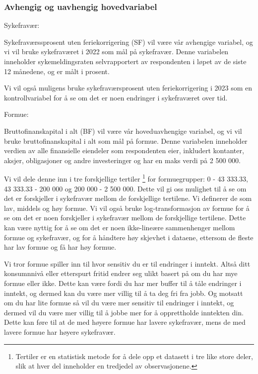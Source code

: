 \documentclass[
  12pt,
  a4paper,
  DIV=11,
  numbers=noendperiod]{scrartcl}
\begin{document}
\subsubsection{Avhengig og uavhengig
hovedvariabel}\label{avhengig-og-uavhengig-hovedvariabel}

Sykefravær:

Sykefraværssprosent uten feriekorrigering (SF) vil være vår avhengige
variabel, og vi vil bruke sykefraværet i 2022 som mål på sykefravær.
Denne variabelen inneholder sykemeldingsraten selvrapportert av
respondenten i løpet av de siste 12 månedene, og er målt i prosent.

Vi vil også muligens bruke sykefraværsprosent uten feriekorrigering i
2023 som en kontrollvariabel for å se om det er noen endringer i
sykefraværet over tid.

Formue:

Bruttofinanskapital i alt (BF) vil være vår hoveduavhengige variabel, og
vi vil bruke bruttofinanskapital i alt som mål på formue. Denne
variabelen inneholder verdien av alle finansielle eiendeler som
respondenten eier, inkludert kontanter, aksjer, obligasjoner og andre
investeringer og har en maks verdi på 2 500 000.

Vi vil dele denne inn i tre forskjellige tertiler \footnote{Tertiler er
  en statistisk metode for å dele opp et datasett i tre like store
  deler, slik at hver del inneholder en tredjedel av observasjonene.}
for formuegrupper: 0 - 43 333.33, 43 333.33 - 200 000 og 200 000 - 2 500
000. Dette vil gi oss mulighet til å se om det er forskjeller i
sykefravær mellom de forskjellige tertilene. Vi definerer de som lav,
middels og høy formue. Vi vil også bruke log-transformasjon av formue
for å se om det er noen forskjeller i sykefravær mellom de forskjellige
tertilene. Dette kan være nyttig for å se om det er noen ikke-lineære
sammenhenger mellom formue og sykefravær, og for å håndtere høy skjevhet
i dataene, ettersom de fleste har lav formue og få har høy formue.

Vi tror formue spiller inn til hvor sensitiv du er til endringer i
inntekt. Altså ditt konsumnnivå eller etterspurt fritid endrer seg ulikt
basert på om du har mye formue eller ikke. Dette kan være fordi du har
mer buffer til å tåle endringer i inntekt, og dermed kan du være mer
villig til å ta deg fri fra jobb. Og motsatt om du har lite formue så
vil du være mer sensitiv til endringer i inntekt, og dermed vil du være
mer villig til å jobbe mer for å opprettholde inntekten din. Dette kan
føre til at de med høyere formue har lavere sykefravær, mens de med
lavere formue har høyere sykefravær.
\end{document}

